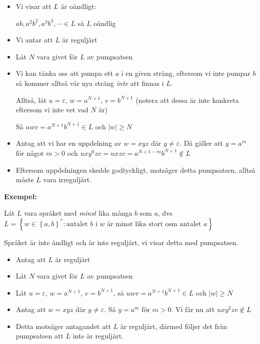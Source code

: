 \begin{itemize}
  \item Vi visar att $L$ är oändligt:\par
    $ab, a^2b^2,a^3b^3,\cdots\in L$ så $L$ oändlig\par
  \item Vi antar att $L$ är reguljärt
  \item Låt $N$ vara givet för $L$ av pumpsatsen
  \item Vi kan tänka oss att pumpa ett $a$ i en given sträng, eftersom vi inte pumpar $b$ så kommer alltså vår nya sträng \textit{inte} att finnas i $L$.\par
    \noindent Alltså, låt $u=\varepsilon$, $w=a^{N+1}$, $v=b^{N+1}$ (notera att dessa är inte konkreta eftersom vi inte vet vad $N$ är)\par
    \noindent Så $uwv = a^{N+1}b^{N+1}\in L$ och $\left|w\right|\geq N$\par
  \item Antag att vi har en uppdelning av $w = xyz$ där $y\neq\varepsilon$. Då gäller att $y=a^m$ för något $m>0$ och $uxy^0zv=uxzv=a^{N+1-m}b^{N+1}\notin L$
  \item Eftersom uppdelningen skedde godtyckligt, motsäger detta pumpsatsen, alltså måste $L$ vara irreguljärt.  
\end{itemize}
\par\bigskip
\noindent\textbf{Exempel:}\par
\noindent Låt $L$ vara språket med \textit{minst} lika många $b$ som $a$, dvs $L = \left\{w\in\left\{a,b\right\}^*: \text{antalet $b$ i $w$ är minst lika stort osm antalet $a$}\right\}$
\par\bigskip
\noindent Språket är inte ändligt och är inte reguljärt, vi visar detta med pumpsatsen. 
\begin{itemize}
  \item Antag att $L$ är reguljärt
  \item Låt $N$ vara givet för $L$ av pumpsatsen
  \item Låt $u=\varepsilon$, $w=a^{N+1}$, $v = b^{N+1}$, så $uwv = a^{N+1}b^{N+1}\in L$ och $\left|w\right|\geq N$
  \item Antag att $w=xyz$ där $y\neq\varepsilon$. Så $y=a^m$ för $m>0$. Vi får nu att $uxy^2zv\notin L$ 
  \item Detta motsäger antagandet att $L$ är reguljärt, därmed följer det från pumpsatsen att $L$ inte är reguljärt.
\end{itemize}\par


